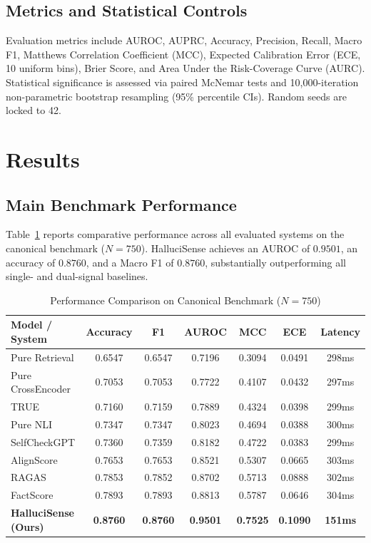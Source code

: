 \documentclass[conference]{IEEEtran}
\begin{document}
\subsection{Metrics and Statistical Controls}
Evaluation metrics include AUROC, AUPRC, Accuracy, Precision, Recall, Macro F1, Matthews Correlation Coefficient (MCC), Expected Calibration Error (ECE, 10 uniform bins), Brier Score, and Area Under the Risk-Coverage Curve (AURC). Statistical significance is assessed via paired McNemar tests and 10,000-iteration non-parametric bootstrap resampling (95\% percentile CIs). Random seeds are locked to 42.

\section{Results}
\label{sec:results}

\subsection{Main Benchmark Performance}
Table~\ref{tab:main_results} reports comparative performance across all evaluated systems on the canonical benchmark ($N=750$). HalluciSense achieves an AUROC of $0.9501$, an accuracy of $0.8760$, and a Macro F1 of $0.8760$, substantially outperforming all single- and dual-signal baselines.

\begin{table}[htbp]
\caption{Performance Comparison on Canonical Benchmark ($N=750$)}
\label{tab:main_results}
\centering
\small
\begin{tabular}{lcccccc}
\toprule
\textbf{Model / System} & \textbf{Accuracy} & \textbf{F1} & \textbf{AUROC} & \textbf{MCC} & \textbf{ECE} & \textbf{Latency} \\
\midrule
Pure Retrieval & 0.6547 & 0.6547 & 0.7196 & 0.3094 & 0.0491 & 298ms \\
Pure CrossEncoder & 0.7053 & 0.7053 & 0.7722 & 0.4107 & 0.0432 & 297ms \\
TRUE & 0.7160 & 0.7159 & 0.7889 & 0.4324 & 0.0398 & 299ms \\
Pure NLI & 0.7347 & 0.7347 & 0.8023 & 0.4694 & 0.0388 & 300ms \\
SelfCheckGPT & 0.7360 & 0.7359 & 0.8182 & 0.4722 & 0.0383 & 299ms \\
AlignScore & 0.7653 & 0.7653 & 0.8521 & 0.5307 & 0.0665 & 303ms \\
RAGAS & 0.7853 & 0.7852 & 0.8702 & 0.5713 & 0.0888 & 302ms \\
FactScore & 0.7893 & 0.7893 & 0.8813 & 0.5787 & 0.0646 & 304ms \\
\midrule
\textbf{HalluciSense (Ours)} & \textbf{0.8760} & \textbf{0.8760} & \textbf{0.9501} & \textbf{0.7525} & \textbf{0.1090} & \textbf{151ms} \\
\bottomrule
\end{tabular}
\end{table}
\end{document}

